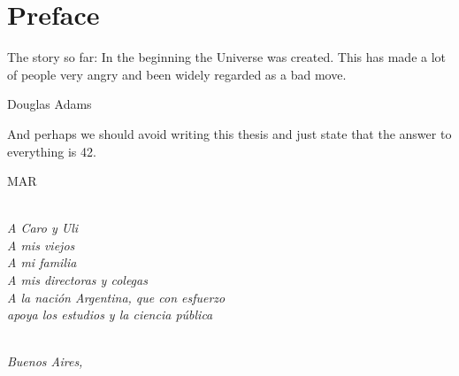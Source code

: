\chapter*{Preface}

\epigraph{The story so far: In the beginning the Universe was created. This has made a lot of people very angry and been widely regarded as a bad move.}{Douglas Adams}
\epigraph{And perhaps we should avoid writing this thesis and just state that the answer to everything is 42.}{MAR}



\emph{ \\ A Caro y Uli \\ A mis viejos \\ A mi familia \\A mis directoras y colegas \\ A la nación Argentina, que con esfuerzo\\ apoya los estudios y la ciencia pública}

\begin{flushright}
{\makeatletter\itshape
    \@author \\
    Buenos Aires, \monthname{} \the\year{}
\makeatother}
\end{flushright}
